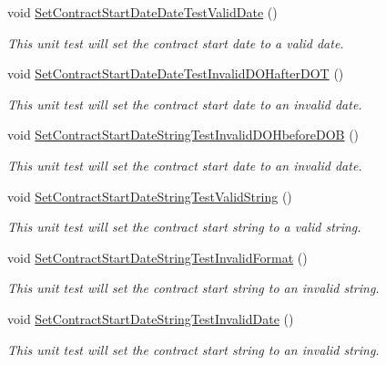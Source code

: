 \begin{DoxyCompactItemize}
void \hyperlink{class_my_all_employee_1_1_tests_1_1_contract_employee_tests_a24545e0849679f5bef330efd01ed406e}{Set\+Contract\+Start\+Date\+Date\+Test\+Valid\+Date} ()
\begin{DoxyCompactList}\small\item\em This unit test will set the contract start date to a valid date. \end{DoxyCompactList}\item 
void \hyperlink{class_my_all_employee_1_1_tests_1_1_contract_employee_tests_ae10e97e6a955b9da89ffb268e01aa6c6}{Set\+Contract\+Start\+Date\+Date\+Test\+Invalid\+D\+O\+Hafter\+D\+O\+T} ()
\begin{DoxyCompactList}\small\item\em This unit test will set the contract start date to an invalid date. \end{DoxyCompactList}\item 
void \hyperlink{class_my_all_employee_1_1_tests_1_1_contract_employee_tests_a989034924eddd56877cf0838593b9602}{Set\+Contract\+Start\+Date\+String\+Test\+Invalid\+D\+O\+Hbefore\+D\+O\+B} ()
\begin{DoxyCompactList}\small\item\em This unit test will set the contract start date to an invalid date. \end{DoxyCompactList}\item 
void \hyperlink{class_my_all_employee_1_1_tests_1_1_contract_employee_tests_ac41ba86681724f03e8f1f85c3d359fea}{Set\+Contract\+Start\+Date\+String\+Test\+Valid\+String} ()
\begin{DoxyCompactList}\small\item\em This unit test will set the contract start string to a valid string. \end{DoxyCompactList}\item 
void \hyperlink{class_my_all_employee_1_1_tests_1_1_contract_employee_tests_a995964039ce3dc1dd4cbba72becf5f6c}{Set\+Contract\+Start\+Date\+String\+Test\+Invalid\+Format} ()
\begin{DoxyCompactList}\small\item\em This unit test will set the contract start string to an invalid string. \end{DoxyCompactList}\item 
void \hyperlink{class_my_all_employee_1_1_tests_1_1_contract_employee_tests_a27bedf46bccc7c5e28e72e81131b6e6a}{Set\+Contract\+Start\+Date\+String\+Test\+Invalid\+Date} ()
\begin{DoxyCompactList}\small\item\em This unit test will set the contract start string to an invalid string. \end{DoxyCompactList}\item 

\end{DoxyCompactItemize}
